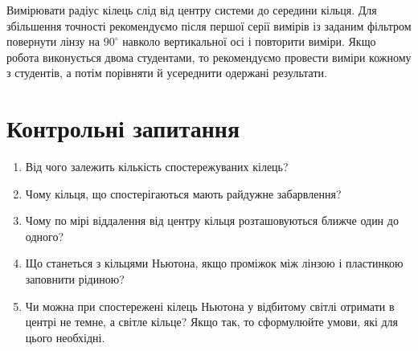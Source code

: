 Вимірювати радіус кілець слід від центру системи до середини кільця. Для збільшення точності рекомендуємо після першої серії вимірів із заданим фільтром повернути лінзу на $90^\circ$ навколо вертикальної осі  і повторити виміри. Якщо робота виконується двома студентами, то рекомендуємо провести виміри кожному з студентів, а потім порівняти й усереднити одержані результати.


\section*{Контрольні запитання}
\begin{enumerate}[label*=\arabic*.]
    \item Від чого залежить кількість спостережуваних кілець?
    \item Чому кільця, що спостерігаються мають райдужне забарвлення? 
    \item  Чому по мірі віддалення від центру кільця розташовуються ближче один до одного?
    \item Що станеться з кільцями Ньютона, якщо проміжок між лінзою і пластинкою заповнити рідиною?
    \item Чи можна при спостережені кілець Ньютона у відбитому світлі отримати в центрі не темне, а світле кільце? Якщо так, то
    сформулюйте умови, які для цього необхідні.
\end{enumerate}
